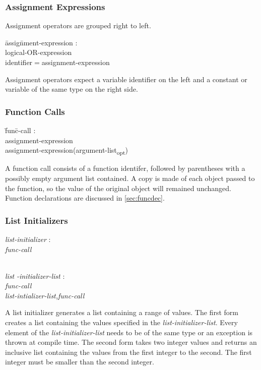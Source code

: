 \documentclass{article}
\begin{document}
\subsubsection{Assignment Expressions}
Assignment operators are grouped right to left.
\begin{itshape}
\begin{tabbing}
	\= assig\=nment-expression : \\
		\>\> logical-OR-expression \\
		\>\> identifier$=$assignment-expression 
\end{tabbing}
\end{itshape}
Assignment operators expect a variable identifier on the left and a constant or variable of the same type on the right side.

\subsubsection{Function Calls}
\begin{itshape}
\begin{tabbing}
	\= fun\=c-call : \\
		\>\> assignment-expression \\
		\>\> assignment-expression(argument-list\textsubscript{opt}) \\ 
\end{tabbing}
\end{itshape}
A function call consists of a function identifer, followed by parentheses with a possibly empty argument list contained. A copy is made of each object passed to the function, so the value of the original object will remained unchanged. Function declarations are discussed in \ref{sec:funcdec}.

\subsubsection{List Initializers}
\begin{tabbing}
	\=\emph{lis}\=\emph{t-initializer} : \\
		\>\> \emph{func-call} \\
		\>\> [\emph{list-intializer-list}] \\
		\> 
\end{tabbing}

\begin{tabbing}
	\= \emph{list} \= \emph{-initializer-list} : \\
		\>\> \emph{func-call} \\
		\>\> \emph{list-intializer-list,func-call}
\end{tabbing}
A list initializer generates a list containing a range of values. The first form creates a list containing the values specified in the \emph{list-initializer-list}. Every element of the \emph{list-initializer-list} needs to be of the same type or an exception is thrown at compile time. The second form takes two integer values and returns an inclusive list containing the values from the first integer to the second. The first integer must be smaller than the second integer.
\end{document}
